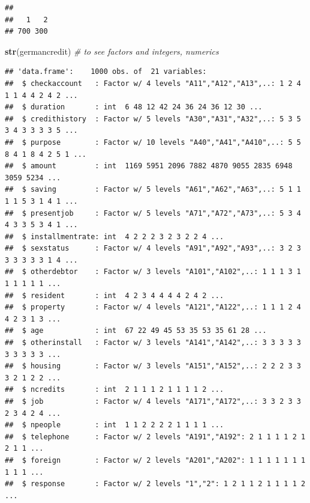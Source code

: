 \documentclass[]{article}
\newenvironment{Shaded}{\begin{snugshade}}{\end{snugshade}}
\newcommand{\CommentTok}[1]{\textcolor[rgb]{0.56,0.35,0.01}{\textit{#1}}}
\newcommand{\DataTypeTok}[1]{\textcolor[rgb]{0.13,0.29,0.53}{#1}}
\newcommand{\DecValTok}[1]{\textcolor[rgb]{0.00,0.00,0.81}{#1}}
\newcommand{\FloatTok}[1]{\textcolor[rgb]{0.00,0.00,0.81}{#1}}
\newcommand{\KeywordTok}[1]{\textcolor[rgb]{0.13,0.29,0.53}{\textbf{#1}}}
\newcommand{\NormalTok}[1]{#1}
\newcommand{\OperatorTok}[1]{\textcolor[rgb]{0.81,0.36,0.00}{\textbf{#1}}}
\newcommand{\OtherTok}[1]{\textcolor[rgb]{0.56,0.35,0.01}{#1}}
\newcommand{\StringTok}[1]{\textcolor[rgb]{0.31,0.60,0.02}{#1}}
\begin{document}
\begin{verbatim}
## 
##   1   2 
## 700 300
\end{verbatim}

\begin{Shaded}
\begin{Highlighting}[]
\KeywordTok{str}\NormalTok{(germancredit)  }\CommentTok{# to see factors and integers, numerics}
\end{Highlighting}
\end{Shaded}

\begin{verbatim}
## 'data.frame':    1000 obs. of  21 variables:
##  $ checkaccount   : Factor w/ 4 levels "A11","A12","A13",..: 1 2 4 1 1 4 4 2 4 2 ...
##  $ duration       : int  6 48 12 42 24 36 24 36 12 30 ...
##  $ credithistory  : Factor w/ 5 levels "A30","A31","A32",..: 5 3 5 3 4 3 3 3 3 5 ...
##  $ purpose        : Factor w/ 10 levels "A40","A41","A410",..: 5 5 8 4 1 8 4 2 5 1 ...
##  $ amount         : int  1169 5951 2096 7882 4870 9055 2835 6948 3059 5234 ...
##  $ saving         : Factor w/ 5 levels "A61","A62","A63",..: 5 1 1 1 1 5 3 1 4 1 ...
##  $ presentjob     : Factor w/ 5 levels "A71","A72","A73",..: 5 3 4 4 3 3 5 3 4 1 ...
##  $ installmentrate: int  4 2 2 2 3 2 3 2 2 4 ...
##  $ sexstatus      : Factor w/ 4 levels "A91","A92","A93",..: 3 2 3 3 3 3 3 3 1 4 ...
##  $ otherdebtor    : Factor w/ 3 levels "A101","A102",..: 1 1 1 3 1 1 1 1 1 1 ...
##  $ resident       : int  4 2 3 4 4 4 4 2 4 2 ...
##  $ property       : Factor w/ 4 levels "A121","A122",..: 1 1 1 2 4 4 2 3 1 3 ...
##  $ age            : int  67 22 49 45 53 35 53 35 61 28 ...
##  $ otherinstall   : Factor w/ 3 levels "A141","A142",..: 3 3 3 3 3 3 3 3 3 3 ...
##  $ housing        : Factor w/ 3 levels "A151","A152",..: 2 2 2 3 3 3 2 1 2 2 ...
##  $ ncredits       : int  2 1 1 1 2 1 1 1 1 2 ...
##  $ job            : Factor w/ 4 levels "A171","A172",..: 3 3 2 3 3 2 3 4 2 4 ...
##  $ npeople        : int  1 1 2 2 2 2 1 1 1 1 ...
##  $ telephone      : Factor w/ 2 levels "A191","A192": 2 1 1 1 1 2 1 2 1 1 ...
##  $ foreign        : Factor w/ 2 levels "A201","A202": 1 1 1 1 1 1 1 1 1 1 ...
##  $ response       : Factor w/ 2 levels "1","2": 1 2 1 1 2 1 1 1 1 2 ...
\end{verbatim}

\begin{Shaded}
\end{Shaded}
\end{document}

